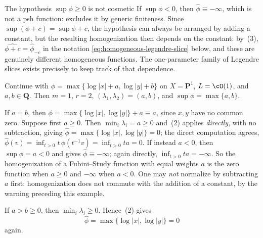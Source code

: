 \begin{warning}{The hypothesis $\sup\phi\geq0$ is not cosmetic}
If $\sup\phi<0$, then $\widehat\phi\equiv-\infty$, which is not a psh
function:  excludes it by generic finiteness.  Since
$\sup(\phi+c)=\sup\phi+c$, the hypothesis can always be arranged by
adding a constant, but the resulting homogenization then depends on the
constant: by \,(3),
$\widehat{\phi+c}=\widehat\phi_{-c}$ in the notation
\eqref{eq:homogeneous-legendre-slice} below, and these are genuinely
different homogeneous functions.  The one-parameter family of Legendre
slices exists precisely to keep track of that dependence.
\end{warning}

\begin{example}
\label{ex:ch35-homogenize-p1}
Continue  with
$\phi=\max\{\log|x|+a,\log|y|+b\}$ on $X=\mathbf P^1$,
$L=\cO(1)$, and $a,b\in\mathbf Q$.  Then $m=1$,
$r=2$, $(\lambda_1,\lambda_2)=(a,b)$, and
$\sup\phi=\max\{a,b\}$.

If $a=b$, then $\phi=\max\{\log|x|,\log|y|\}+a\equiv a$, since $x,y$
have no common zero.  Suppose first $a\geq0$.  Then
$\min_i\lambda_i=a\geq0$ and \,(2) applies
\emph{directly}, with no subtraction, giving
$\widehat\phi=\max\{\log|x|,\log|y|\}=0$; the direct computation agrees,
$\widehat\phi(v)=\inf_{t>0}t\,\phi(t^{-1}v)=\inf_{t>0}ta=0$.  If instead
$a<0$, then $\sup\phi=a<0$ and  gives
$\widehat\phi\equiv-\infty$; again directly,
$\inf_{t>0}ta=-\infty$.  So the homogenization of a Fubini--Study
function with equal weights $a$ is the zero function when $a\geq0$ and
$-\infty$ when $a<0$.  One may \emph{not} normalize by subtracting
$a$ first: homogenization does not commute with the addition of a
constant, by the warning preceding this example.

If $a>b\geq0$, then $\min_i\lambda_i\geq0$.  Hence
\,(2) gives
\[
 \widehat\phi=\max\{\log|x|,\log|y|\}=0
\]
again.


\end{example}
